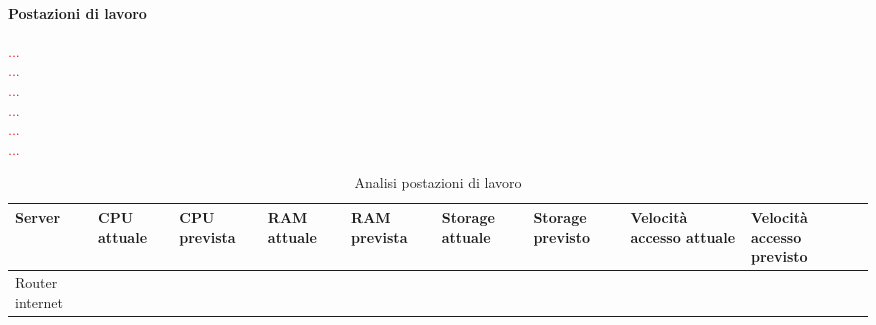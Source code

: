 	\paragraph{Postazioni di lavoro}
	\textcolor{red}{ ... \\  ... \\ ... \\ ... \\  ... \\ ... \\ }
		\begin{table}[h!]
		\begin{tabular}{|C{2cm} || C{1.5cm} |C{1.5cm} || C{1.5cm} |C{1.5cm}|| C{1.5cm} |C{1.5cm}||C{1.5cm} |C{1.5cm}|} 
			\hline
			\textbf{Server}  & \textbf{CPU attuale} & \textbf{CPU prevista} & \textbf{RAM attuale} & \textbf{RAM prevista} & \textbf{Storage attuale} & \textbf{Storage previsto} & \textbf{Velocità accesso attuale} & \textbf{Velocità accesso previsto}\\ \hline
			Router internet	& 	&  &   &  &	 & & & \\ \hline
		\end{tabular}
		\caption{Analisi postazioni di lavoro}\label{tab:analisiPostazioni}
	\end{table}





